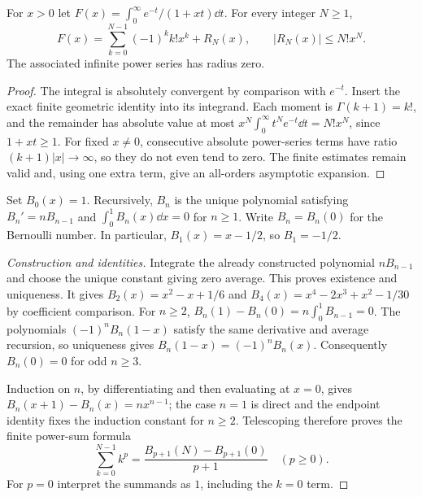 \begin{example}
For $x>0$ let $F(x)=\int_0^\infty e^{-t}/(1+xt)\dd t$. For every integer
$N\geq1$,
\[
 F(x)=\sum_{k=0}^{N-1}(-1)^kk!x^k+R_N(x),\qquad
 |R_N(x)|\leq N!x^N.
\]
The associated infinite power series has radius zero.
\end{example}
\begin{proof}
The integral is absolutely convergent by comparison with $e^{-t}$. Insert
the exact finite geometric identity into its integrand. Each moment is
$\Gamma(k+1)=k!$, and the remainder has absolute value at most
$x^N\int_0^\infty t^Ne^{-t}\dd t=N!x^N$, since $1+xt\geq1$.
For fixed $x\ne0$, consecutive absolute power-series terms have ratio
$(k+1)|x|\to\infty$, so they do not even tend to zero. The finite estimates
remain valid and, using one extra term, give an all-orders asymptotic expansion.
\end{proof}

\begin{definition}
Set $B_0(x)=1$. Recursively, $B_n$ is the unique polynomial satisfying
$B_n'=nB_{n-1}$ and $\int_0^1B_n(x)\dd x=0$ for $n\geq1$.
Write $B_n=B_n(0)$ for the Bernoulli number. In particular,
$B_1(x)=x-1/2$, so $B_1=-1/2$.
\end{definition}
\begin{proof}[Construction and identities]
Integrate the already constructed polynomial $nB_{n-1}$ and choose the unique
constant giving zero average. This proves existence and uniqueness. It gives
$B_2(x)=x^2-x+1/6$ and $B_4(x)=x^4-2x^3+x^2-1/30$ by coefficient comparison.
For $n\geq2$,
$B_n(1)-B_n(0)=n\int_0^1B_{n-1}=0$.
The polynomials $(-1)^nB_n(1-x)$ satisfy the same derivative and average
recursion, so uniqueness gives $B_n(1-x)=(-1)^nB_n(x)$.
Consequently $B_n(0)=0$ for odd $n\geq3$.

Induction on $n$, by differentiating and then evaluating at $x=0$, gives
$B_n(x+1)-B_n(x)=nx^{n-1}$; the case $n=1$ is direct and the endpoint
identity fixes the induction constant for $n\geq2$. Telescoping therefore
proves the finite power-sum formula
\[
 \sum_{k=0}^{N-1}k^p=
 \frac{B_{p+1}(N)-B_{p+1}(0)}{p+1}\quad(p\geq0).
\]
For $p=0$ interpret the summands as $1$, including the $k=0$ term.
\end{proof}

